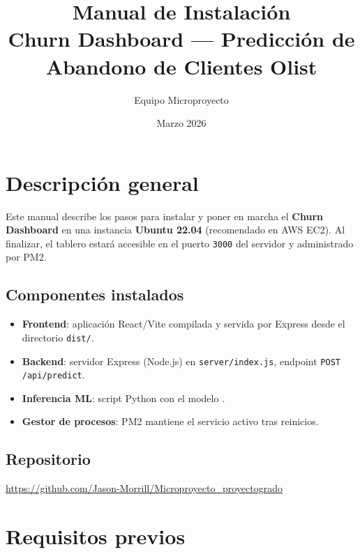 \documentclass[11pt]{article}
\title{Manual de Instalación\\
\large Churn Dashboard --- Predicción de Abandono de Clientes Olist}
\author{Equipo Microproyecto}
\date{Marzo 2026}
\begin{document}
\maketitle
\tableofcontents
\newpage

\section{Descripción general}

Este manual describe los pasos para instalar y poner en marcha el
\textbf{Churn Dashboard} en una instancia \textbf{Ubuntu 22.04} (recomendado
en AWS EC2). Al finalizar, el tablero estará accesible en el puerto
\texttt{3000} del servidor y administrado por PM2.

\subsection*{Componentes instalados}

\begin{itemize}[itemsep=2pt]
  \item \textbf{Frontend}: aplicación React/Vite compilada y servida por
        Express desde el directorio \texttt{dist/}.
  \item \textbf{Backend}: servidor Express (Node.js) en
        \texttt{server/index.js}, endpoint \texttt{POST /api/predict}.
  \item \textbf{Inferencia ML}: script Python 
        con el modelo .
  \item \textbf{Gestor de procesos}: PM2 mantiene el servicio activo tras
        reinicios.
\end{itemize}

\subsection*{Repositorio}

\begin{center}
  \url{https://github.com/Jason-Morrill/Microproyecto_proyectogrado}
\end{center}

\section{Requisitos previos}
\end{document}
